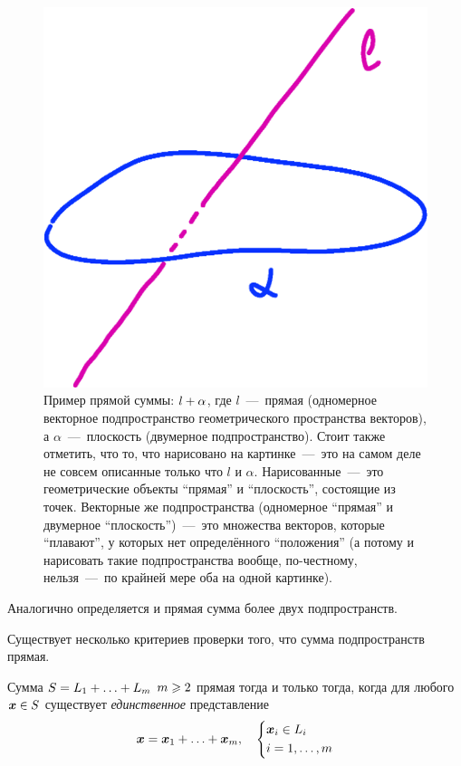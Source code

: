 \documentclass[a4paper,12pt]{article}
\begin{document}
  \begin{figure}[h]
    \centering
  
    \includegraphics[width=0.5\columnwidth]{direct-sum}
  
    \caption{Пример прямой суммы: $l \hm+ \alpha$, где $l$~---~прямая (одномерное векторное подпространство геометрического пространства векторов), а $\alpha$~---~плоскость (двумерное подпространство). Стоит также отметить, что то, что нарисовано на картинке~---~это на самом деле не совсем описанные только что $l$ и $\alpha$. Нарисованные~---~это геометрические объекты ``прямая'' и ``плоскость'', состоящие из точек. Векторные же подпространства (одномерное ``прямая'' и двумерное ``плоскость'')~---~это множества векторов, которые ``плавают'', у которых нет определённого ``положения'' (а потому и нарисовать такие подпространства вообще, по-честному, нельзя~---~по крайней мере оба на одной картинке).}
    \label{fig:direct-sum}
  \end{figure}
  
  Аналогично определяется и прямая сумма более двух подпространств.
  
  Существует несколько критериев проверки того, что сумма подпространств прямая.
  
  \begin{proposition}
    Сумма $S \hm= L_1 \hm+ \ldots \hm+ L_m$ $m \hm\geq 2$ прямая тогда и только тогда, когда для любого $\bds x \hm\in S$ существует \emph{единственное} представление
    \begin{equation}\label{eq:sum-of-xi-for-criterion1}
      \bds x = \bds x_1 + \ldots + \bds x_m,\quad
      \left\{
        \begin{aligned}
          &\bds x_i \hm\in L_i\\
          &i \hm= 1, \ldots, m
        \end{aligned}
      \right.
    \end{equation}
  \end{proposition}
  
\end{document}
